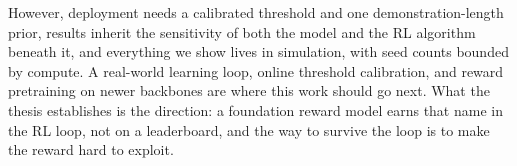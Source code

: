 However, deployment needs a calibrated threshold and one demonstration-length prior, results inherit the sensitivity of both the model and the RL algorithm beneath it, and everything we show lives in simulation, with seed counts bounded by compute. A real-world learning loop, online threshold calibration, and reward pretraining on newer backbones are where this work should go next. What the thesis establishes is the direction: a foundation reward model earns that name in the RL loop, not on a leaderboard, and the way to survive the loop is to make the reward hard to exploit.
